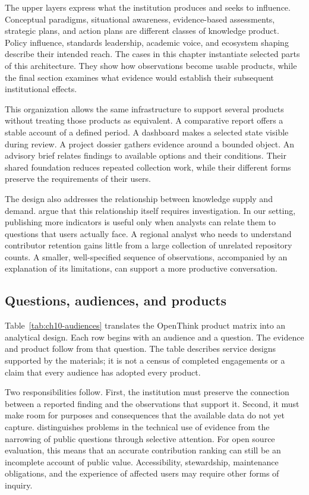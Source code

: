 The upper layers express what the institution produces and seeks to influence. Conceptual paradigms, situational awareness, evidence-based assessments, strategic plans, and action plans are different classes of knowledge product. Policy influence, standards leadership, academic voice, and ecosystem shaping describe their intended reach. The cases in this chapter instantiate selected parts of this architecture. They show how observations become usable products, while the final section examines what evidence would establish their subsequent institutional effects.

This organization allows the same infrastructure to support several products without treating those products as equivalent. A comparative report offers a stable account of a defined period. A dashboard makes a selected state visible during review. A project dossier gathers evidence around a bounded object. An advisory brief relates findings to available options and their conditions. Their shared foundation reduces repeated collection work, while their different forms preserve the requirements of their users.

The design also addresses the relationship between knowledge supply and demand. \citet{sarewitz2007} argue that this relationship itself requires investigation. In our setting, publishing more indicators is useful only when analysts can relate them to questions that users actually face. A regional analyst who needs to understand contributor retention gains little from a large collection of unrelated repository counts. A smaller, well-specified sequence of observations, accompanied by an explanation of its limitations, can support a more productive conversation.

\subsection{Questions, audiences, and products}
Table~\ref{tab:ch10-audiences} translates the OpenThink product matrix into an analytical design. Each row begins with an audience and a question. The evidence and product follow from that question. The table describes service designs supported by the materials; it is not a census of completed engagements or a claim that every audience has adopted every product.



Two responsibilities follow. First, the institution must preserve the connection between a reported finding and the observations that support it. Second, it must make room for purposes and consequences that the available data do not yet capture. \citet{parkhurst2017} distinguishes problems in the technical use of evidence from the narrowing of public questions through selective attention. For open source evaluation, this means that an accurate contribution ranking can still be an incomplete account of public value. Accessibility, stewardship, maintenance obligations, and the experience of affected users may require other forms of inquiry.

